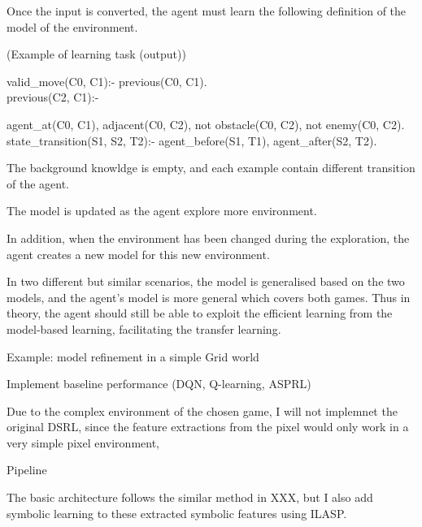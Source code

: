 \documentclass[12pt,twoside]{report}
\begin{document}
Once the input is converted, the agent must learn the following definition of the model of the environment.

\begin{examp} (Example of learning task (output))

valid\_move(C0, C1):- previous(C0, C1).
\\
previous(C2, C1):-

agent\_at(C0, C1),
adjacent(C0, C2),
not obstacle(C0, C2),
not enemy(C0, C2).
\\
state\_transition(S1, S2, T2):-
  agent\_before(S1, T1),
  agent\_after(S2, T2).

\end{examp}
\label{learning_task}

The background knowldge is empty, and each example contain different transition of the agent.

The model is updated as the agent explore more environment.


In addition, when the environment has been changed during the exploration, the agent creates a new model for this new environment.


In two different but similar scenarios, the model is generalised based on the two models, and the agent's model is more general which covers both games. Thus in theory, the agent should still be able to exploit the efficient learning from the model-based learning, facilitating the transfer learning.


Example: model refinement in a simple Grid world


Implement baseline performance (DQN, Q-learning, ASPRL)

Due to the complex environment of the chosen game, I will not implemnet the original DSRL, since the feature extractions from the pixel would only work in a very simple pixel environment,

Pipeline

The basic architecture follows the similar method in XXX, but I also add symbolic learning to these extracted symbolic features using ILASP.
\end{document}
